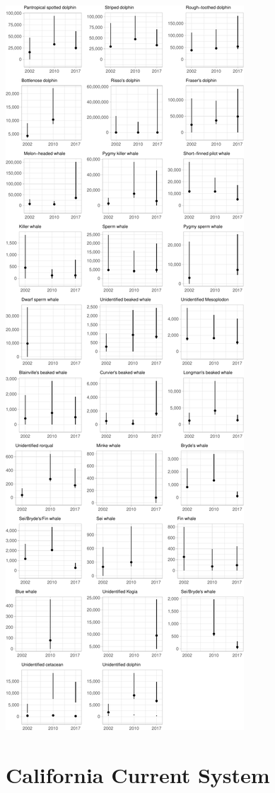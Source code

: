 \documentclass[
]{book}
\begin{document}
\includegraphics{figures/unnamed-chunk-443-1.pdf}

\hypertarget{california-current-system}{%
\chapter{California Current System}\label{california-current-system}}
\end{document}
